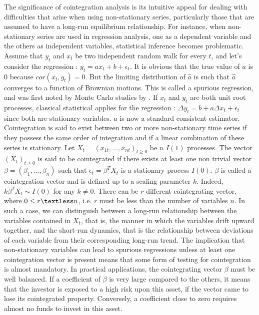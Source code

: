 \documentclass[11pt,a4,twosided,singlespacing,titlepagenumber=on]{scrreprt}
\numberwithin{equation}{chapter} %
\theoremstyle{remark}
\begin{document}
The significance of cointegration analysis is its intuitive appeal for dealing with difficulties that arise when using non-stationary series, particularly those that are assumed to have a long-run equilibrium relationship. For instance, when non-stationary series are used in regression analysis, one as a dependent variable and the others as independent variables, statistical inference becomes problematic. Assume that $y_t$ and $x_t$ be two independent random walk for every $t$, and let's consider the regression : $y_t = a x_t + b + \epsilon_t$. It is obvious that the true value of $a$ is 0 because $cor(x_t, y_t) = 0$. But the limiting distribution of $\hat{a}$ is such that $\hat{a}$ converges to a function of Brownian motions. This is called a spurious regression, and was first noted by Monte Carlo studies by \cite{granger1974}. If $x_t$ and $y_t$ are both unit root processes, classical statistical applies for the regression : $\Delta y_t = b + a \Delta x_t + \epsilon_t$ since both are stationary variables. $\hat{a}$ is now a standard consistent estimator. \\


Cointegration is said to exist between two or more non-stationary time series if they possess the same order of integration and if a linear combination of these series is stationary. Let $X_t = (x_{1t},...,x_{nt})_{t \geq 0}$ be $n$ $I(1)$ processes. The vector $(X_t)_{t \geq 0}$ is said to be cointegrated if there exists at least one non trivial vector $\beta = (\beta_1,...,\beta_n)$ such that $\epsilon_t = \beta^T X_t$ is a stationary process $I(0)$. $\beta$ is called a cointegration vector and is defined up to a scaling parameter $k$. Indeed, $k\beta^TX_t \sim I(0)$ for any $k \neq 0$. There can be $r$ different cointegrating vector, where $0 \leq r \textless n$, i.e. $r$ must be less than the number of variables $n$. In such a case, we can distinguish between a long-run relationship between the variables contained in $X_t$, that is, the manner in which the variables drift upward together, and the short-run dynamics, that is the relationship between deviations of each variable from their corresponding long-run trend. The implication that non-stationary variables can lead to spurious regressions unless at least one cointegration vector is present means that some form of testing for cointegration is almost mandatory. In practical applications, the cointegrating vector $\beta$ must be well balanced. If a coefficient of $\beta$ is very large compared to the others, it means that the investor is exposed to a high risk upon this asset, if the vector came to lose its cointegrated property. Conversely, a coefficient close to zero requires almost no funds to invest in this asset.
\end{document}
